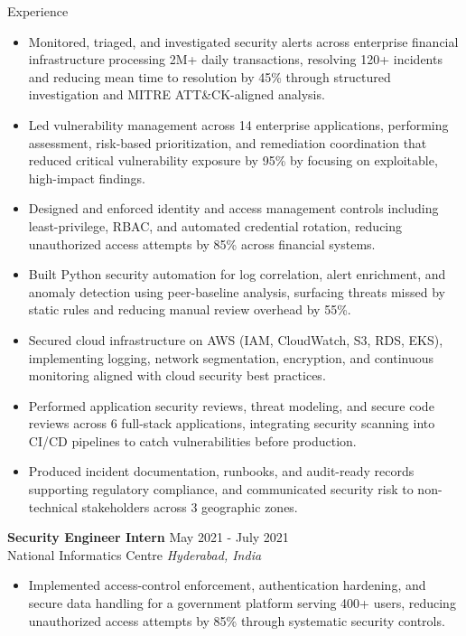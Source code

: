 \documentclass{resume}
\begin{document}
\begin{rSection}{Experience}
\begin{itemize}
\vspace{-2mm}
  \item Monitored, triaged, and investigated security alerts across enterprise financial infrastructure processing 2M+ daily transactions, resolving 120+ incidents and reducing mean time to resolution by 45\% through structured investigation and MITRE ATT\&CK-aligned analysis.
\vspace{-2mm}
  \item Led vulnerability management across 14 enterprise applications, performing assessment, risk-based prioritization, and remediation coordination that reduced critical vulnerability exposure by 95\% by focusing on exploitable, high-impact findings.
\vspace{-2mm}
  \item Designed and enforced identity and access management controls including least-privilege, RBAC, and automated credential rotation, reducing unauthorized access attempts by 85\% across financial systems.
\vspace{-2mm}
  \item Built Python security automation for log correlation, alert enrichment, and anomaly detection using peer-baseline analysis, surfacing threats missed by static rules and reducing manual review overhead by 55\%.
\vspace{-2mm}
  \item Secured cloud infrastructure on AWS (IAM, CloudWatch, S3, RDS, EKS), implementing logging, network segmentation, encryption, and continuous monitoring aligned with cloud security best practices.
\vspace{-2mm}
  \item Performed application security reviews, threat modeling, and secure code reviews across 6 full-stack applications, integrating security scanning into CI/CD pipelines to catch vulnerabilities before production.
\vspace{-2mm}
  \item Produced incident documentation, runbooks, and audit-ready records supporting regulatory compliance, and communicated security risk to non-technical stakeholders across 3 geographic zones.
\end{itemize}

\textbf{Security Engineer Intern} \hfill May 2021 - July 2021\\
National Informatics Centre \hfill \textit{Hyderabad, India}

\begin{itemize}
\vspace{-2mm}
  \item Implemented access-control enforcement, authentication hardening, and secure data handling for a government platform serving 400+ users, reducing unauthorized access attempts by 85\% through systematic security controls.
\end{itemize}

\end{rSection}
\end{document}
